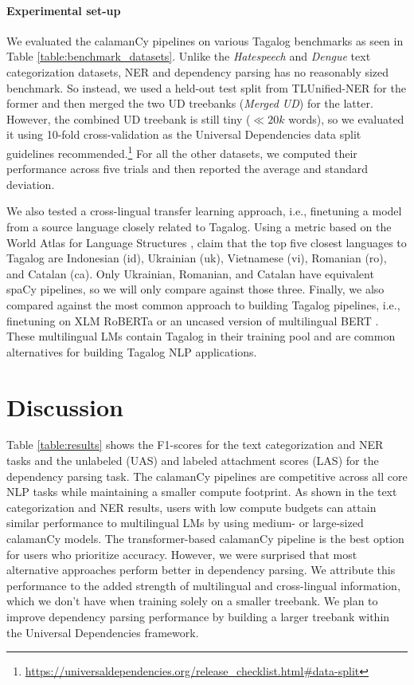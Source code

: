 \documentclass[11pt]{article}
\begin{document}
\paragraph*{Experimental set-up} 
We evaluated the calamanCy pipelines on various Tagalog benchmarks as seen in Table \ref{table:benchmark_datasets}.
Unlike the \textit{Hatespeech} and \textit{Dengue} text categorization datasets, NER and dependency parsing has no reasonably sized benchmark.
So instead, we used a held-out test split from TLUnified-NER for the former and then merged the two UD treebanks (\textit{Merged UD}) for the latter. 
However, the combined UD treebank is still tiny ($\ll 20k$ words), so we evaluated it using 10-fold cross-validation as the Universal Dependencies data split guidelines recommended.\footnote[4]{\url{https://universaldependencies.org/release_checklist.html\#data-split}}
For all the other datasets, we computed their performance across five trials and then reported the average and standard deviation.

We also tested a cross-lingual transfer learning approach, i.e., finetuning a model from a source language closely related to Tagalog.
Using a metric based on the World Atlas for Language Structures \citep{Haspelmath2005WALS,Agic2017CrossLingualPS}, \citet{Aquino2020ParsingIT} claim that the top five closest languages to Tagalog are Indonesian (id), Ukrainian (uk), Vietnamese (vi), Romanian (ro), and Catalan (ca).
Only Ukrainian, Romanian, and Catalan have equivalent spaCy pipelines, so we will only compare against those three.
Finally, we also compared against the most common approach to building Tagalog pipelines, i.e., finetuning on XLM RoBERTa \citep{Conneau2019UnsupervisedCR} or an uncased version of multilingual BERT \citep{Devlin2019BERTPO}.
These multilingual LMs contain Tagalog in their training pool and are common alternatives for building Tagalog NLP applications.

\section{Discussion}

Table \ref{table:results} shows the F1-scores for the text categorization and NER tasks and the unlabeled (UAS) and labeled attachment scores (LAS) for the dependency parsing task.
The calamanCy pipelines are competitive across all core NLP tasks while maintaining a smaller compute footprint.
As shown in the text categorization and NER results, users with low compute budgets can attain similar performance to multilingual LMs by using medium- or large-sized calamanCy models.
The transformer-based calamanCy pipeline is the best option for users who prioritize accuracy.
However, we were surprised that most alternative approaches perform better in dependency parsing.
We attribute this performance to the added strength of multilingual and cross-lingual information, which we don't have when training solely on a smaller treebank.
We plan to improve dependency parsing performance by building a larger treebank within the Universal Dependencies framework.
\end{document}
